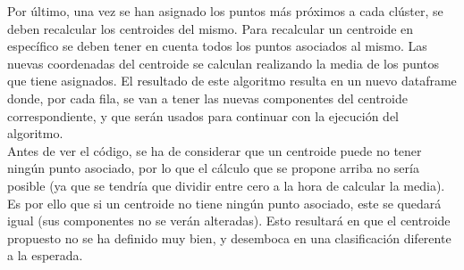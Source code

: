 \documentclass[12pt]{report}\usepackage[]{graphicx}\usepackage[dvipsnames]{xcolor}
\begin{document}
				 Por último, una vez se han asignado los puntos más próximos a cada clúster, se deben recalcular los centroides del mismo. Para recalcular un centroide en específico se deben tener en cuenta todos los puntos asociados al mismo. Las nuevas coordenadas del centroide se calculan realizando la media de los puntos que tiene asignados. El resultado de este algoritmo resulta en un nuevo dataframe donde, por cada fila, se van a tener las nuevas componentes del centroide correspondiente, y que serán usados para continuar con la ejecución del algoritmo.\\
				 
				 Antes de ver el código, se ha de considerar que un centroide puede no tener ningún punto asociado, por lo que el cálculo que se propone arriba no sería posible (ya que se tendría que dividir entre cero a la hora de calcular la media). Es por ello que si un centroide no tiene ningún punto asociado, este se quedará igual (sus componentes no se verán alteradas). Esto resultará en que el centroide propuesto no se ha definido muy bien, y desemboca en una clasificación diferente a la esperada.
				 
\end{document}
